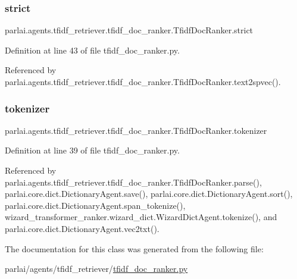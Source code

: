 \subsubsection{\texorpdfstring{strict}{strict}}
{\footnotesize\ttfamily parlai.\+agents.\+tfidf\+\_\+retriever.\+tfidf\+\_\+doc\+\_\+ranker.\+Tfidf\+Doc\+Ranker.\+strict}



Definition at line 43 of file tfidf\+\_\+doc\+\_\+ranker.\+py.



Referenced by parlai.\+agents.\+tfidf\+\_\+retriever.\+tfidf\+\_\+doc\+\_\+ranker.\+Tfidf\+Doc\+Ranker.\+text2spvec().

\mbox{\label{classparlai_1_1agents_1_1tfidf__retriever_1_1tfidf__doc__ranker_1_1TfidfDocRanker_ae125548ea43894545541ae71fdc35ff7}} 
\subsubsection{\texorpdfstring{tokenizer}{tokenizer}}
{\footnotesize\ttfamily parlai.\+agents.\+tfidf\+\_\+retriever.\+tfidf\+\_\+doc\+\_\+ranker.\+Tfidf\+Doc\+Ranker.\+tokenizer}



Definition at line 39 of file tfidf\+\_\+doc\+\_\+ranker.\+py.



Referenced by parlai.\+agents.\+tfidf\+\_\+retriever.\+tfidf\+\_\+doc\+\_\+ranker.\+Tfidf\+Doc\+Ranker.\+parse(), parlai.\+core.\+dict.\+Dictionary\+Agent.\+save(), parlai.\+core.\+dict.\+Dictionary\+Agent.\+sort(), parlai.\+core.\+dict.\+Dictionary\+Agent.\+span\+\_\+tokenize(), wizard\+\_\+transformer\+\_\+ranker.\+wizard\+\_\+dict.\+Wizard\+Dict\+Agent.\+tokenize(), and parlai.\+core.\+dict.\+Dictionary\+Agent.\+vec2txt().



The documentation for this class was generated from the following file\+:\begin{DoxyCompactItemize}
\item 
parlai/agents/tfidf\+\_\+retriever/\hyperlink{tfidf__doc__ranker_8py}{tfidf\+\_\+doc\+\_\+ranker.\+py}\end{DoxyCompactItemize}
